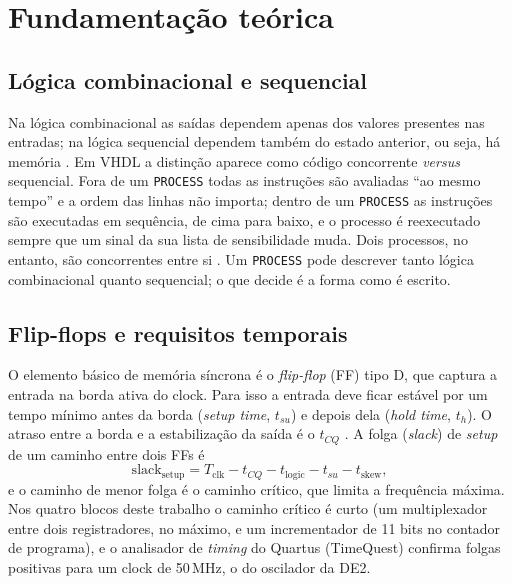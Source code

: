 \chapter{Fundamentação teórica}
\label{cap:fundamentos}

\section{Lógica combinacional e sequencial}

Na lógica combinacional as saídas dependem apenas dos valores presentes nas entradas; na lógica sequencial dependem também do estado anterior, ou seja, há memória \cite{aula4}. Em VHDL a distinção aparece como código concorrente \textit{versus} sequencial. Fora de um \texttt{PROCESS} todas as instruções são avaliadas ``ao mesmo tempo'' e a ordem das linhas não importa; dentro de um \texttt{PROCESS} as instruções são executadas em sequência, de cima para baixo, e o processo é reexecutado sempre que um sinal da sua lista de sensibilidade muda. Dois processos, no entanto, são concorrentes entre si \cite{aula8}. Um \texttt{PROCESS} pode descrever tanto lógica combinacional quanto sequencial; o que decide é a forma como é escrito.

\section{Flip-flops e requisitos temporais}

O elemento básico de memória síncrona é o \textit{flip-flop} (FF) tipo D, que captura a entrada na borda ativa do clock. Para isso a entrada deve ficar estável por um tempo mínimo antes da borda (\textit{setup time}, $t_{su}$) e depois dela (\textit{hold time}, $t_h$). O atraso entre a borda e a estabilização da saída é o $t_{CQ}$ \cite{aula1}. A folga (\textit{slack}) de \textit{setup} de um caminho entre dois FFs é
\begin{equation}
  \text{slack}_{\text{setup}} = T_{\text{clk}} - t_{CQ} - t_{\text{logic}} - t_{su} - t_{\text{skew}},
  \label{eq:slack}
\end{equation}
e o caminho de menor folga é o caminho crítico, que limita a frequência máxima. Nos quatro blocos deste trabalho o caminho crítico é curto (um multiplexador entre dois registradores, no máximo, e um incrementador de 11 bits no contador de programa), e o analisador de \textit{timing} do Quartus (TimeQuest) confirma folgas positivas para um clock de 50\,MHz, o do oscilador da DE2.

